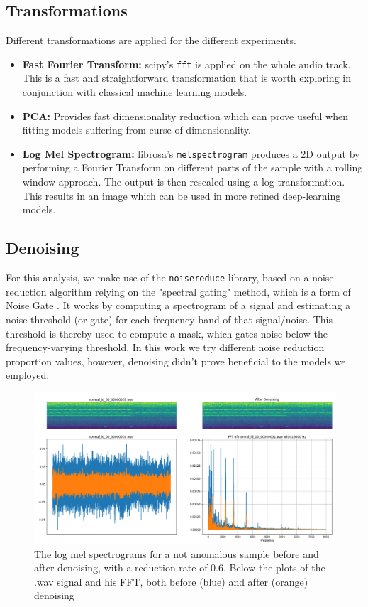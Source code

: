 \documentclass{article}
\begin{document}
   	\subsection{Transformations}
   	Different transformations are applied for the different experiments. 
	\begin{itemize}
		\item \textbf{Fast Fourier Transform:} scipy's \texttt{fft} is applied on the whole audio track. This is a fast and straightforward transformation that is worth exploring in conjunction with classical machine learning models.
		\item \textbf{PCA:} Provides fast dimensionality reduction which can prove useful when fitting models suffering from curse of dimensionality.
		\item \textbf{Log Mel Spectrogram:} librosa's \texttt{melspectrogram} produces a 2D output by performing a Fourier Transform on different parts of the sample with a rolling window approach. The output is then rescaled using a log transformation. This results in an image which can be used in more refined deep-learning models.
	\end{itemize}
    
    \subsection{Denoising}
     For this analysis, we make use of the \texttt{noisereduce} \cite{tim_sainburg_2019_3243139} library, based on a noise reduction algorithm relying on the "spectral gating" method, which is a form of Noise Gate \cite{sainburg2020finding}. It works by computing a spectrogram of a signal and estimating a noise threshold (or gate) for each frequency band of that signal/noise. This threshold is thereby used to compute a mask, which gates noise below the frequency-varying threshold. In this work we try different noise reduction proportion values, however, denoising didn't prove beneficial to the models we employed.
     \begin{figure}
        \centering
        \includegraphics[width=0.8\linewidth]{assets/mod_out_normal_id_00_00000001.wav.png}
        \caption{The log mel spectrograms for a not anomalous sample before and after denoising, with a reduction rate of 0.6. Below the plots of the .wav signal and his FFT, both before (blue) and after (orange) denoising}
        \label{fig:normal_id_denos}
    \end{figure}
\end{document}
